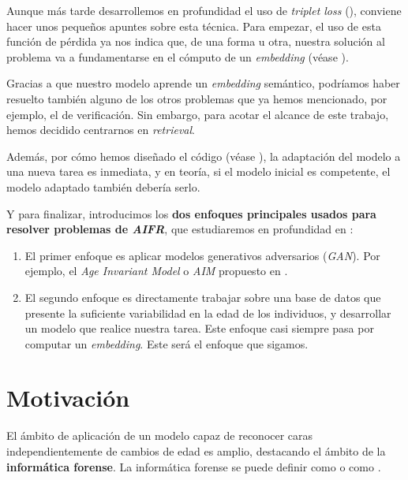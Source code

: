 Aunque más tarde desarrollemos en profundidad el uso de \textit{triplet loss} (), conviene hacer unos pequeños apuntes sobre esta técnica. Para empezar, el uso de esta función de pérdida ya nos indica que, de una forma u otra, nuestra solución al problema va a fundamentarse en el cómputo de un \textit{embedding} (véase ).

Gracias a que nuestro modelo aprende un \textit{embedding} semántico, podríamos haber resuelto también alguno de los otros problemas que ya hemos mencionado, por ejemplo, el de verificación. Sin embargo, para acotar el alcance de este trabajo, hemos decidido centrarnos en \textit{retrieval}.

Además, por cómo hemos diseñado el código (véase ), la adaptación del modelo a una nueva tarea es inmediata, y en teoría, si el modelo inicial es competente, el modelo adaptado también debería serlo.

Y para finalizar, introducimos los \textbf{dos enfoques principales usados para resolver problemas de \textit{AIFR}}, que estudiaremos en profundidad en :

\begin{enumerate}
    \item El primer enfoque es aplicar modelos generativos adversarios (\textit{GAN}). Por ejemplo, el \textit{Age Invariant Model} o \textit{AIM} propuesto en \cite{informatica:tecnica_sintesis_aifr}.
    \item El segundo enfoque es directamente trabajar sobre una base de datos que presente la suficiente variabilidad en la edad de los individuos, y desarrollar un modelo que realice nuestra tarea. Este enfoque casi siempre pasa por computar un \textit{embedding}. Este será el enfoque que sigamos.
\end{enumerate}

\section{Motivación}

El ámbito de aplicación de un modelo capaz de reconocer caras independientemente de cambios de edad es amplio, destacando el ámbito de la \textbf{informática forense}. La informática forense se puede definir como  \cite{informatica:libro_informatica_forense} o como  \cite{informatica:libro_informatica_forense}.

